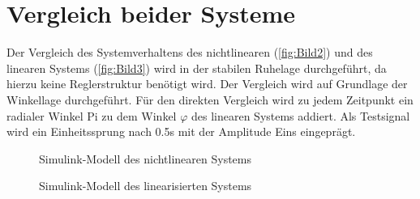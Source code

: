 \section{Vergleich beider Systeme} \label{sec:systemvergleich}

Der Vergleich des Systemverhaltens des nichtlinearen (\autoref{fig:Bild2}) und des linearen Systems (\autoref{fig:Bild3}) wird in der stabilen Ruhelage durchgeführt, da hierzu keine Reglerstruktur benötigt wird. Der Vergleich wird auf Grundlage der Winkellage durchgeführt. Für den direkten Vergleich wird zu jedem Zeitpunkt ein radialer Winkel Pi zu dem Winkel $\varphi$ des linearen Systems addiert. Als Testsignal wird ein Einheitssprung nach 0.5s mit der Amplitude Eins eingeprägt.

\begin{figure}[H]
   \centering
   \caption[Simulink-Modell des nichtlinearen Systems]{Simulink-Modell des nichtlinearen Systems}
   \label{fig:Bild2}
\end{figure}

\begin{figure}[H]
   \centering
   \caption[Simulink-Modell des linearisierten Systems]{Simulink-Modell des linearisierten Systems}
   \label{fig:Bild3}
\end{figure}

